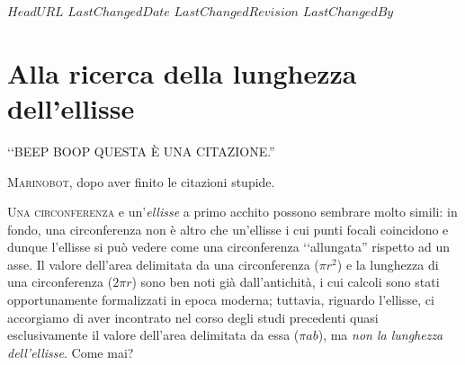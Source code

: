 \svnidlong
{$HeadURL$}
{$LastChangedDate$}
{$LastChangedRevision$}
{$LastChangedBy$}

\chapter{Alla ricerca della lunghezza dell'ellisse}

\begin{introduction}
‘‘BEEP BOOP QUESTA È UNA CITAZIONE.''
\begin{flushright}
	\textsc{Marinobot,} dopo aver finito le citazioni stupide.
\end{flushright}
\end{introduction}
\lettrine[findent=1pt, nindent=0pt]{U}{na circonferenza} e un'\emph{ellisse} a primo acchito possono sembrare molto simili: in fondo, una circonferenza non è altro che un'ellisse i cui punti focali coincidono e dunque l'ellisse si può vedere come una circonferenza ‘‘allungata'' rispetto ad un asse. Il valore dell'area delimitata da una circonferenza ($\pi r^2$) e la lunghezza di una circonferenza ($2\pi r$) sono ben noti già dall'antichità, i cui calcoli sono stati opportunamente formalizzati in epoca moderna; tuttavia, riguardo l'ellisse, ci accorgiamo di aver incontrato nel corso degli studi precedenti quasi esclusivamente il valore dell'area delimitata da essa ($\pi ab$), ma \emph{non la lunghezza dell'ellisse}. Come mai?\\
